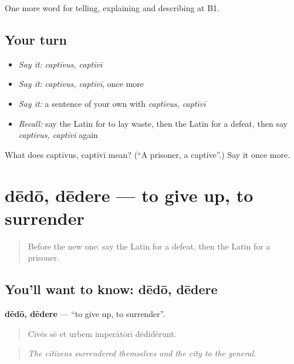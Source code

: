 \begin{grammarlens}[title={What you've built}]
One more word for telling, explaining and describing at B1.
\end{grammarlens}

\subsection*{Your turn}
\begin{itemize}
\raggedright
  \item \emph{Say it:} \emph{captīvus, captīvī}
  \item \emph{Say it:} \emph{captīvus, captīvī}, once more
  \item \emph{Say it:} a sentence of your own with \emph{captīvus, captīvī}
  \item \emph{Recall:} say the Latin for to lay waste, then the Latin for a defeat, then say \emph{captīvus, captīvī} again
\end{itemize}

\begin{tcolorbox}[breakable,colback=teal!4,colframe=teal!35!black,title={Before you move on}]
What does captīvus, captīvī mean? (\textquotedblleft{}A prisoner, a captive\textquotedblright{}.) Say it once more.
\end{tcolorbox}
\section[dēdō, dēdere]{dēdō, dēdere — to give up, to surrender}

\label{lesson:LA-C343-dedo}



\begin{quote}
Before the new one: say the Latin for a defeat, then the Latin for a prisoner.
\end{quote}

\subsection*{You'll want to know: dēdō, dēdere}
\textbf{dēdō, dēdere} — \textquotedblleft{}to give up, to surrender\textquotedblright{}.

\begin{quote}
Cīvēs sē et urbem imperātōrī dēdidērunt.
\end{quote}

\begin{quote}
\emph{The citizens surrendered themselves and the city to the general.}
\end{quote}

